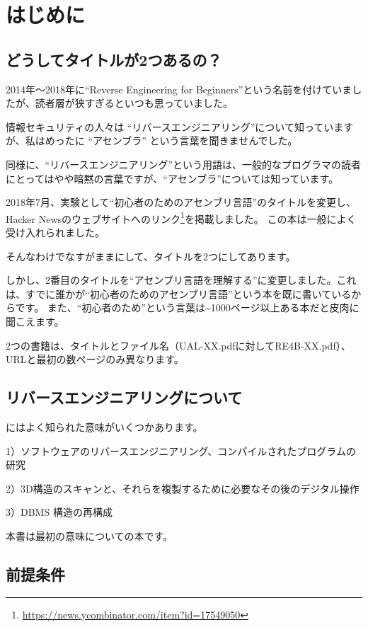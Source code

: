\section*{はじめに}

\subsection*{どうしてタイトルが2つあるの？}
\label{TwoTitles}

2014年～2018年に``Reverse Engineering for Beginners''という名前を付けていましたが、読者層が狭すぎるといつも思っていました。

情報セキュリティの人々は ``リバースエンジニアリング''について知っていますが、私はめったに ``アセンブラ'' という言葉を聞きませんでした。

同様に、``リバースエンジニアリング''という用語は、一般的なプログラマの読者にとってはやや暗黙の言葉ですが、``アセンブラ''については知っています。

2018年7月、実験として``初心者のためのアセンブリ言語''のタイトルを変更し、Hacker Newsのウェブサイトへのリンク\footnote{\url{https://news.ycombinator.com/item?id=17549050}}を掲載しました。
この本は一般によく受け入れられました。

そんなわけでなすがままにして、タイトルを2つにしてあります。

しかし、2番目のタイトルを``アセンブリ言語を理解する''に変更しました。これは、すでに誰かが``初心者のためのアセンブリ言語''という本を既に書いているからです。 
また、``初心者のため''という言葉は\textasciitilde{}1000ページ以上ある本だと皮肉に聞こえます。

2つの書籍は、タイトルとファイル名（UAL-XX.pdfに対してRE4B-XX.pdf）、URLと最初の数ページのみ異なります。

\subsection*{リバースエンジニアリングについて}

にはよく知られた意味がいくつかあります。

1）ソフトウェアのリバースエンジニアリング、コンパイルされたプログラムの研究

2）3D構造のスキャンと、それらを複製するために必要なその後のデジタル操作

3）\ac{DBMS} 構造の再構成

本書は最初の意味についての本です。

\subsection*{前提条件}

